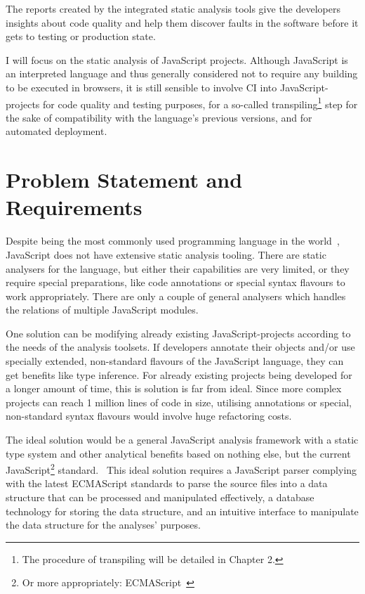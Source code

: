 The reports created by the integrated static analysis tools give the developers insights about code quality and help them discover faults in the software before it gets to testing or production state.

I will focus on the static analysis of JavaScript projects. Although JavaScript is an interpreted language and thus generally considered not to require any building to be executed in browsers, it is still sensible to involve CI into JavaScript-projects for code quality and testing purposes, for a so-called transpiling\footnote{The procedure of transpiling will be detailed in Chapter 2.} step for the sake of compatibility with the language's previous versions, and for automated deployment.


\section{Problem Statement and Requirements}

Despite being the most commonly used programming language in the world~\cite{javascriptstackoverflow}, JavaScript does not have extensive static analysis tooling. There are static analysers for the language, but either their capabilities are very limited, or they require special preparations, like code annotations or special syntax flavours to work appropriately. There are only a couple of general analysers which handles the relations of multiple JavaScript modules.

One solution can be modifying already existing JavaScript-projects according to the needs of the analysis toolsets. If developers annotate their objects and/or use specially extended, non-standard flavours of the JavaScript language, they can get benefits like type inference. For already existing projects being developed for a longer amount of time, this is solution is far from ideal. Since more complex projects can reach 1 million lines of code in size, utilising annotations or special, non-standard syntax flavours would involve huge refactoring costs.

The ideal solution would be a general JavaScript analysis framework with a static type system and other analytical benefits based on nothing else, but the current JavaScript\footnote{Or more appropriately: ECMAScript~\cite{ecmascriptstandard}} standard.~\cite{ecmascriptstandard} This ideal solution requires a JavaScript parser complying with the latest ECMAScript standards to parse the source files into a data structure that can be processed and manipulated effectively, a database technology for storing the data structure, and an intuitive interface to manipulate the data structure for the analyses' purposes.

